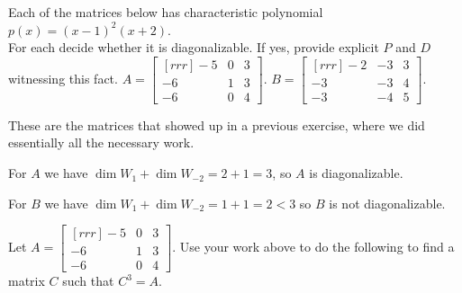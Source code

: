 \ii Each of the matrices below has characteristic polynomial $p(x)=(x-1)^2(x+2)$. 
\\
For each decide whether it is diagonalizable. If yes, provide explicit $P$ and $D$ witnessing this fact. 
\bb[itemsep=5pt, topsep=5pt]
\ii $A=\begin{bmatrix}[rrr] -5&0&3\\ -6&1&3\\ -6&0&4\end{bmatrix}$.
\ii $B=\begin{bmatrix}[rrr]-2&-3&3\\ -3&-3&4\\ -3&-4&5\end{bmatrix}$.
\ee
\begin{solution}
These are the matrices that showed up in a previous exercise, where we did essentially all the necessary work. 

For $A$ we have $\dim W_1+\dim W_{-2}=2+1=3$, so $A$ is diagonalizable. 

For $B$ we have $\dim W_1+\dim W_{-2}=1+1=2<3$ so $B$ is not diagonalizable. 
\end{solution}
\ii Let 
$A=\begin{bmatrix}[rrr] -5&0&3\\ -6&1&3\\ -6&0&4\end{bmatrix}$. Use your work above to do the following to find a matrix $C$ such that $C^3=A$.  
\\
